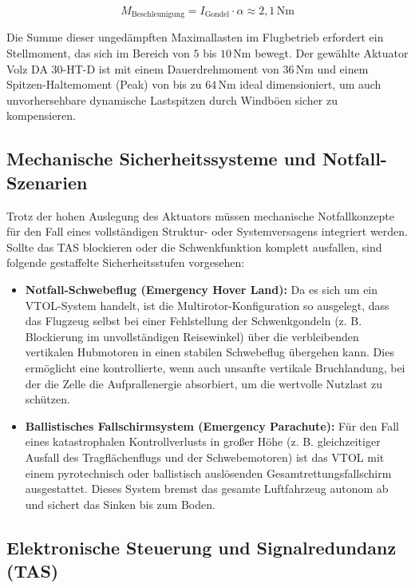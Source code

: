 \begin{equation}
M_{\text{Beschleunigung}} = I_{\text{Gondel}} \cdot \alpha \approx 2,1\,\text{Nm}
\end{equation}

\noindent
Die Summe dieser ungedämpften Maximallasten im Flugbetrieb erfordert ein Stellmoment, das sich im Bereich von $5$ bis $10\,\text{Nm}$ bewegt. Der gewählte Aktuator Volz DA 30-HT-D ist mit einem Dauerdrehmoment von $36\,\text{Nm}$ und einem Spitzen-Haltemoment (Peak) von bis zu $64\,\text{Nm}$ ideal dimensioniert, um auch unvorhersehbare dynamische Lastspitzen durch Windböen sicher zu kompensieren.

\subsection{Mechanische Sicherheitssysteme und Notfall-Szenarien}
\noindent
Trotz der hohen Auslegung des Aktuators müssen mechanische Notfallkonzepte für den Fall eines vollständigen Struktur- oder Systemversagens integriert werden. Sollte das TAS blockieren oder die Schwenkfunktion komplett ausfallen, sind folgende gestaffelte Sicherheitsstufen vorgesehen:

\begin{itemize}
    \item \textbf{Notfall-Schwebeflug (Emergency Hover Land):} Da es sich um ein VTOL-System handelt, ist die Multirotor-Konfiguration so ausgelegt, dass das Flugzeug selbst bei einer Fehlstellung der Schwenkgondeln (z. B. Blockierung im unvollständigen Reisewinkel) über die verbleibenden vertikalen Hubmotoren in einen stabilen Schwebeflug übergehen kann. Dies ermöglicht eine kontrollierte, wenn auch unsanfte vertikale Bruchlandung, bei der die Zelle die Aufprallenergie absorbiert, um die wertvolle Nutzlast zu schützen.
    \item \textbf{Ballistisches Fallschirmsystem (Emergency Parachute):} Für den Fall eines katastrophalen Kontrollverlusts in großer Höhe (z. B. gleichzeitiger Ausfall des Tragflächenflugs und der Schwebemotoren) ist das VTOL mit einem pyrotechnisch oder ballistisch auslösenden Gesamtrettungsfallschirm ausgestattet. Dieses System bremst das gesamte Luftfahrzeug autonom ab und sichert das Sinken bis zum Boden.
\end{itemize}

\subsection{Elektronische Steuerung und Signalredundanz (TAS)}


